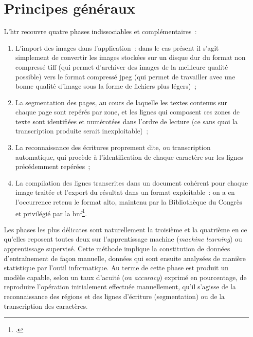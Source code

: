 \documentclass[a4paper,12pt,twoside]{book}
\begin{document}
		\section{Principes généraux}
		
			L'\gls{htr} recouvre quatre phases indissociables et complémentaires~:
			
			\begin{enumerate}
				\item L'import des images dans l'application~: dans le cas présent il s'agit simplement de convertir les images stockées sur un disque dur du format non compressé \textsf{tiff} (qui permet d'archiver des images de la meilleure qualité possible) vers le format compressé \textsf{jpeg} (qui permet de travailler avec une bonne qualité d'image sous la forme de fichiers plus légers)~;
				\item La \gls{segmentation} des pages, au cours de laquelle les textes contenus sur chaque page sont repérés par zone, et les lignes qui composent ces zones de texte sont identifiées et numérotées dans l'ordre de lecture (ce sans quoi la transcription produite serait inexploitable)~;
				\item La reconnaissance des écritures proprement dite, ou transcription automatique, qui procède à l'identification de chaque caractère sur les lignes précédemment repérées~;
				\item La compilation des lignes transcrites dans un document cohérent pour chaque image traitée et l'export du résultat dans un format exploitable~: on a en l'occurrence retenu le format \gls{alto}, maintenu par la Bibliothèque du Congrès et privilégié par la \gls{bnf}\footcite{TechniquesFormatsConversion2022, stokesEScriptoriumVREManuscript2021}.
			\end{enumerate}
			
			Les phases les plus délicates sont naturellement la troisième et la quatrième en ce qu'elles reposent toutes deux sur l'apprentissage machine (\textit{machine learning}) ou apprentissage supervisé. Cette méthode implique la constitution de données d'entraînement de façon manuelle, données qui sont ensuite analysées de manière statistique par l'outil informatique. Au terme de cette phase est produit un modèle capable, selon un taux d'acuité (ou \textit{accuracy}) exprimé en pourcentage, de reproduire l'opération initialement effectuée manuellement, qu'il s'agisse de la reconnaissance des régions et des lignes d'écriture (\gls{segmentation}) ou de la transcription des caractères.
			
\end{document}
